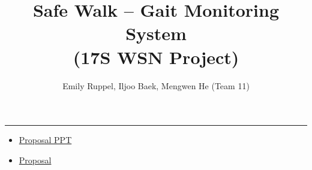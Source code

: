 \documentclass[letterpaper,12pt]{article}
\title{\textbf{Safe Walk -- Gait Monitoring System\\\small (17S WSN Project)}}
\author{Emily Ruppel, Iljoo Baek, Mengwen He (Team 11)}
\newcommand{\panhline}{\begin{center}\rule{\textwidth}{1pt}\end{center}}
\begin{document}
\maketitle

\panhline
\begin{itemize}
	\item \href{./PDFs/GaitMonitoring_Feb-24-17_v0.1.pdf}{Proposal PPT}
	\item \href{./PDFs/proposal_grp11.pdf}{Proposal}
\end{itemize}
	
\end{document}
